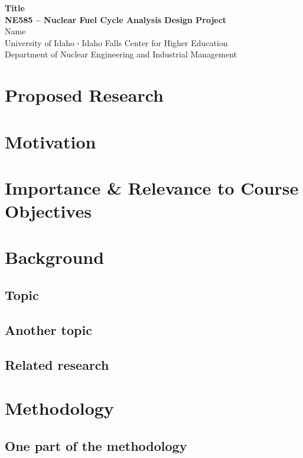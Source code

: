\documentclass[11pt,a4paper]{article}
\newcommand*\sq{\mathbin{\vcenter{\hbox{\rule{.3ex}{.3ex}}}}} %
\begin{document}
{\centering 
    \textbf{Title\\
    NE585 -- Nuclear Fuel Cycle Analysis Design Project\\
    }
    \vspace{0.10in}
    Name\\
    University of Idaho $\sq$ Idaho Falls Center for Higher Education\\
    Department of Nuclear Engineering and Industrial Management
\par
}

\noindent\makebox[\linewidth]{\rule{\textwidth}{0.5pt}} %


\section{Proposed Research}


\section{Motivation}


\section{Importance \& Relevance to Course Objectives}


\section{Background}
\subsection{Topic}

\subsection{Another topic}

\subsection{Related research}


\section{Methodology}
\subsection{One part of the methodology}
\end{document}
